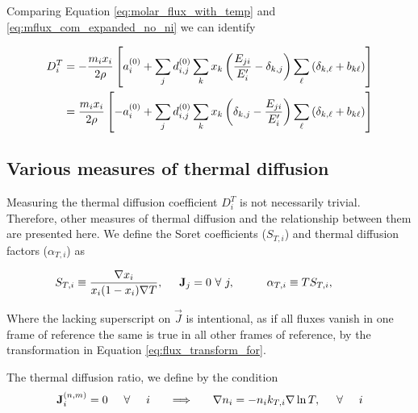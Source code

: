 Comparing Equation \eqref{eq:molar_flux_with_temp} and \eqref{eq:mflux_com_expanded_no_ni} we can identify

\begin{equation}
    \begin{split}
        D_i^T &= - \frac{m_i x_i}{2 \rho} \lsp a_i^{(0)} + \sum_j d_{i,j}^{(0)} \sum_k x_k \lrp \frac{E_{ji}}{E_i'} - \delta_{k,j}\rrp\sum_\ell \lrp \delta_{k,\ell} + b_{k\ell}\rrp \rsp\\
        &= \frac{m_i x_i}{2 \rho} \lsp - a_i^{(0)} + \sum_j d_{i,j}^{(0)} \sum_k x_k \lrp \delta_{k,j} - \frac{E_{ji}}{E_i'} \rrp\sum_\ell \lrp \delta_{k,\ell} + b_{k\ell}\rrp \rsp
    \end{split}
\end{equation}

\subsection{Various measures of thermal diffusion}

Measuring the thermal diffusion coefficient $D_i^{T}$ is not necessarily trivial. Therefore, other measures of thermal diffusion and the relationship between them are presented here. We define the Soret coefficients ($S_{T,i}$) and thermal diffusion factors ($\alpha_{T,i}$) as

\begin{equation}
    S_{T,i} \equiv \frac{\nabla x_i}{x_i(1 - x_i) \nabla T}, \hspace{.5cm} \Vec{J}_j = 0 \ \forall \ j, \hspace{1cm} \alpha_{T,i} \equiv T S_{T,i}, \hspace{1cm}
\end{equation}

Where the lacking superscript on $\Vec{J}$ is intentional, as if all fluxes vanish in one frame of reference the same is true in all other frames of reference, by the transformation in Equation \eqref{eq:flux_transform_for}.

The thermal diffusion ratio, we define by the condition
\begin{equation}
    \mflux_i = 0\hspace{.5cm} \forall \hspace{.5cm} i \hspace{.5cm} \implies \hspace{.5cm} \nabla n_i = - n_i k_{T,i} \nabla \ln T, \hspace{.5cm} \forall \hspace{.5cm} i
\end{equation}

